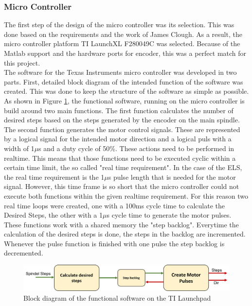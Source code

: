 \subsubsection{Micro Controller}
The first step of the design of the micro controller was its selection. This was done based on the requirements and the work of James Clough. As a result, the micro controller platform TI LaunchXL F280049C was selected. Because of the Matlab support and the hardware ports for encoder, this was a perfect match for this project.\\
The software for the Texas Instruments micro controller was developed in two parts. First, detailed block diagram of the intended function of the software was created. This was done to keep the structure of the software as simple as possible. As shown in Figure \ref{MicroContBlockDia}, the functional software, running on the micro controller is build around two main functions. The first function calculates the number of desired steps based on the steps generated by the encoder on the main spindle. The second function generates the motor control signals. These are represented by a logical signal for the intended motor direction and a logical puls with a width of 1$\mu$s and a duty cycle of 50\%. These actions need to be performed in realtime. This means that those functions need to be executed cyclic within a certain time limit, the so called "real time requirement". In the case of the ELS, the real time requirement is the 1$\mu$s pulse length that is needed for the motor signal. However, this time frame is so short that the micro controller could not execute both functions within the given realtime requirement. For this reason two real time loops were created, one with a 100ms cycle time to calculate the Desired Steps, the other with a 1$\mu$s cycle time to generate the motor pulses. These functions work with a shared memory the "step backlog". Everytime the calculation of the desired steps is done, the steps in the backlog are incremented. Whenever the pulse function is finished with one pulse the step backlog is decremented.\\ 


\begin{figure}
    \begin{center}
    \includegraphics[width=12cm]{Pictures/MicroContBlockDia.png}
    \caption[Block diagram of the functional software on the TI Launchpad]{Block diagram of the functional software on the TI Launchpad}
    \label{MicroContBlockDia}
    \end{center}
\end{figure}

